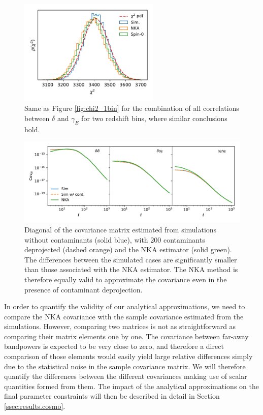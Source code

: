 \documentclass[a4paper,11pt]{article}
\begin{document}
      \begin{figure}
        \centering
        \includegraphics[width=0.6\textwidth]{./figures/run_sph_2b_same_mask_Spin0_NKA_TTTEEE_Full_chi2.pdf}
        \caption{Same as Figure \ref{fig:chi2_1bin} for the combination of all correlations between $\delta$ and $\gamma_E$ for two redshift bins, where similar conclusions hold.}
        \label{fig:chi2_2bins}
      \end{figure}
      \begin{figure}
        \centering
        \includegraphics[width=\textwidth]{./figures/contaminants_diag_cov.pdf}
        \caption{Diagonal of the covariance matrix estimated from simulations without contaminants (solid blue), with 200 contaminants deprojected (dashed orange) and the NKA estimator (solid green). The differences between the simulated cases are significantly smaller than those associated with the NKA estimator. The NKA method is therefore equally valid to approximate the covariance even in the presence of contaminant deprojection.}
        \label{fig:diag_conts}
      \end{figure}
      In order to quantify the validity of our analytical approximations, we need to compare the NKA covariance with the sample covariance estimated from the simulations. However, comparing two matrices is not as straightforward as comparing their matrix elements one by one. The covariance between far-away bandpowers is expected to be very close to zero, and therefore a direct comparison of those elements would easily yield large relative differences simply due to the statistical noise in the sample covariance matrix. We will therefore quantify the differences between the different covariances making use of scalar quantities formed from them. The impact of the analytical approximations on the final parameter constraints will then be described in detail in Section \ref{ssec:results.cosmo}.
      
\end{document}
